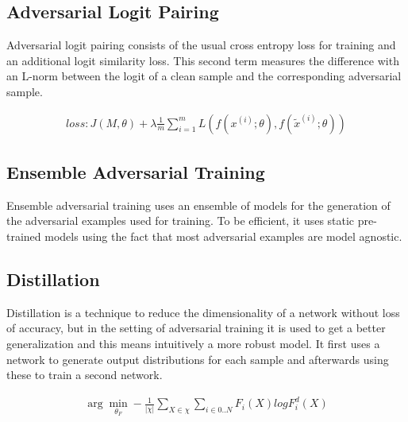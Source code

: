 \documentclass[conference]{IEEEtran}
\begin{document}
\subsection{Adversarial Logit Pairing} \cite{b19, b20}
Adversarial logit pairing consists of the usual cross entropy loss for training and an additional logit similarity loss. This second term measures the difference with an L-norm between the logit of a clean sample and the corresponding adversarial sample.

\begin{align*}
  loss: J(M, \theta) + \lambda \frac{1}{m} \sum_{i=1}^m L(f(x^{(i)}; \theta), f(\tilde{x}^{(i)}; \theta))
\end{align*}

\subsection{Ensemble Adversarial Training} \cite{b23}
Ensemble adversarial training uses an ensemble of models for the generation of the adversarial examples used for training. To be efficient, it uses static pre-trained models using the fact that most adversarial examples are model agnostic.


\subsection{Distillation} \cite{b21, b22}
Distillation is a technique to reduce the dimensionality of a network without loss of accuracy, but in the setting of adversarial training it is used to get a better generalization and this means intuitively a more robust model. It first uses a network to generate output distributions for each sample and afterwards using these to train a second network.  

\begin{align*}
  \arg \min_{\theta_F} - \frac{1}{|\chi|} \sum_{X \in \chi} \sum_{i \in 0..N} F_i(X) log F_i^d(X) \\
\end{align*}

\end{document}
